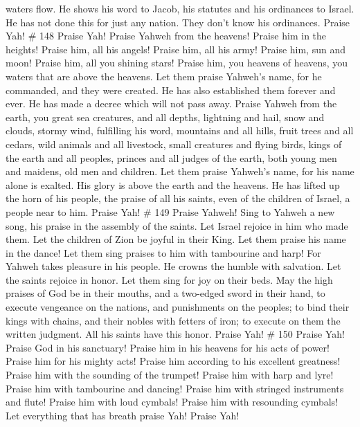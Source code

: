 waters flow.  He shows his word to Jacob, his statutes
and his ordinances to Israel.  He has not done this for
just any nation. They don't know his ordinances. Praise Yah! \# 148
 Praise Yah! Praise Yahweh from the heavens! Praise him in
the heights!  Praise him, all his angels! Praise him, all
his army!  Praise him, sun and moon! Praise him, all you
shining stars!  Praise him, you heavens of heavens, you
waters that are above the heavens.  Let them praise
Yahweh's name, for he commanded, and they were created. 
He has also established them forever and ever. He has made a decree
which will not pass away.  Praise Yahweh from the earth,
you great sea creatures, and all depths,  lightning and
hail, snow and clouds, stormy wind, fulfilling his word, 
mountains and all hills, fruit trees and all cedars, 
wild animals and all livestock, small creatures and flying birds,
 kings of the earth and all peoples, princes and all
judges of the earth,  both young men and maidens, old men
and children.  Let them praise Yahweh's name, for his
name alone is exalted. His glory is above the earth and the heavens.
 He has lifted up the horn of his people, the praise of
all his saints, even of the children of Israel, a people near to him.
Praise Yah! \# 149  Praise Yahweh! Sing to Yahweh a new
song, his praise in the assembly of the saints.  Let
Israel rejoice in him who made them. Let the children of Zion be joyful
in their King.  Let them praise his name in the dance! Let
them sing praises to him with tambourine and harp!  For
Yahweh takes pleasure in his people. He crowns the humble with
salvation.  Let the saints rejoice in honor. Let them sing
for joy on their beds.  May the high praises of God be in
their mouths, and a two-edged sword in their hand,  to
execute vengeance on the nations, and punishments on the peoples;
 to bind their kings with chains, and their nobles with
fetters of iron;  to execute on them the written judgment.
All his saints have this honor. Praise Yah! \# 150  Praise
Yah! Praise God in his sanctuary! Praise him in his heavens for his acts
of power!  Praise him for his mighty acts! Praise him
according to his excellent greatness!  Praise him with the
sounding of the trumpet! Praise him with harp and lyre! 
Praise him with tambourine and dancing! Praise him with stringed
instruments and flute!  Praise him with loud cymbals!
Praise him with resounding cymbals!  Let everything that
has breath praise Yah! Praise Yah!

